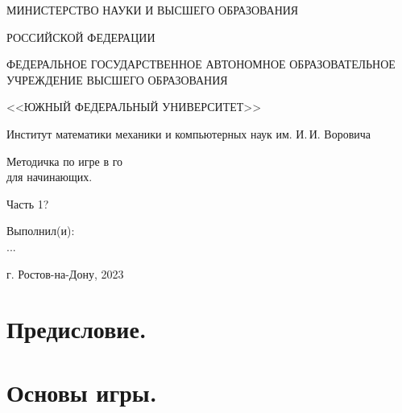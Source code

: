 \documentclass[14pt,a4paper]{extarticle}
\begin{document}
\thispagestyle{empty}
\begin{center}
\small{МИНИСТЕРСТВО НАУКИ И ВЫСШЕГО ОБРАЗОВАНИЯ}\par
\small{РОССИЙСКОЙ ФЕДЕРАЦИИ}\par
\small{ФЕДЕРАЛЬНОЕ ГОСУДАРСТВЕННОЕ АВТОНОМНОЕ ОБРАЗОВАТЕЛЬНОЕ УЧРЕЖДЕНИЕ ВЫСШЕГО ОБРАЗОВАНИЯ}\par
\small{<<ЮЖНЫЙ ФЕДЕРАЛЬНЫЙ УНИВЕРСИТЕТ>>}\par
\normalsize{Институт математики механики и компьютерных наук им. И.\,И. Воровича}\par
\end{center}


\vspace*{5.0em plus 0.2em minus 0.2em}

\begin{center}
Методичка по игре в го\\
для начинающих.
\end{center}

\begin{center}
Часть 1?
\end{center}

\vspace*{5.0em plus 0.2em minus 0.2em}
\begin{flushright}
 Выполнил(и):\\
	...
\end{flushright}


\vspace*{\fill}

\begin{center}
г. Ростов-на-Дону, 2023
\end{center}


\newpage

\thispagestyle{empty}
\tableofcontents


\newpage


\section*{Предисловие.}


\newpage


\section*{Основы игры.}
\end{document}
